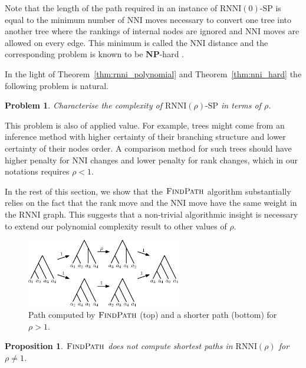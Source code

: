 \documentclass[11pt]{amsart}
\newtheorem{proposition}{Proposition}
\newtheorem{problem}{Problem}
\newcommand{\rnni}{\mathrm{RNNI}}
\newcommand{\findpath}{\textsc{FindPath}}
\newcommand{\nni}{\mathrm{NNI}}
\newcommand{\np}{\mathbf{NP}}
\newcommand{\decprob}[1]{\rnni(#1)\text{-}\mathrm{SP}}
\begin{document}
\proof
Note that the length of the path required in an instance of $\decprob{0}$ is equal to the minimum number of $\nni$ moves necessary to convert one tree into another tree where the rankings of internal nodes are ignored and $\nni$ moves are allowed on every edge.
This minimum is called the $\nni$ distance and the corresponding problem is known to be $\np$-hard \autocite{Dasgupta2000-xa}.
\endproof

In the light of Theorem~\ref{thm:rnni_polynomial} and Theorem~\ref{thm:nni_hard} the following problem is natural.

\begin{problem}
Characterise the complexity of $\decprob{\rho}$ in terms of $\rho$.
\label{prblm:rho_range}
\end{problem}

This problem is also of applied value.
For example, trees might come from an inference method with higher certainty of their branching structure and lower certainty of their nodes order.
A comparison method for such trees should have higher penalty for $\nni$ changes and lower penalty for rank changes, which in our notations requires $\rho < 1$.

In the rest of this section, we show that the $\findpath$ algorithm substantially relies on the fact that the rank move and the $\nni$ move have the same weight in the $\rnni$ graph.
This suggests that a non-trivial algorithmic insight is necessary to extend our polynomial complexity result to other values of $\rho$.

\begin{figure}[ht]
\centering
\includegraphics[width=0.6\textwidth]{fp_rho_greater_1_counterexample}
\caption{Path computed by $\findpath$ (top) and a shorter path (bottom) for $\rho > 1$.}
\label{fig:fp_rho_greater_1_counterexample}
\end{figure}

\begin{proposition}
$\findpath$ does not compute shortest paths in $\rnni(\rho)$ for $\rho \neq 1$.
\label{prop:fp_only_rnni}
\end{proposition}
\end{document}
